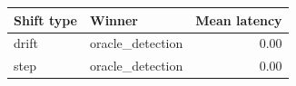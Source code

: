 \begin{tabular}{llr}
\toprule
Shift type & Winner & Mean latency \\
\midrule
drift & oracle\_detection & 0.00 \\
step & oracle\_detection & 0.00 \\
\bottomrule
\end{tabular}
